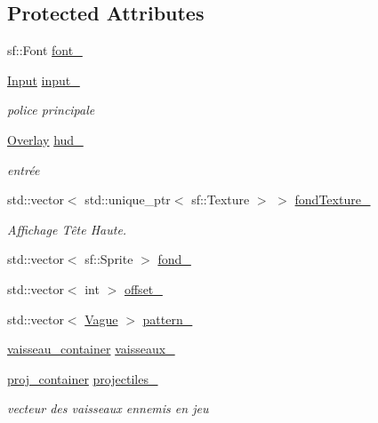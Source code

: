 \subsection*{Protected Attributes}
\begin{DoxyCompactItemize}
\item 
sf\+::\+Font \mbox{\hyperlink{class_partie_ab00aee0dc5c4a9eb16d17160bd6a707a}{font\+\_\+}}
\item 
\mbox{\hyperlink{_input_8h_a5588d60d674991c719a8df848313e966}{Input}} \mbox{\hyperlink{class_partie_a3a6f85686da661a2391dec412354c846}{input\+\_\+}}
\begin{DoxyCompactList}\small\item\em police principale \end{DoxyCompactList}\item 
\mbox{\hyperlink{class_overlay}{Overlay}} \mbox{\hyperlink{class_partie_a7d7dcc006ac52993ac65de1eae66bbf8}{hud\+\_\+}}
\begin{DoxyCompactList}\small\item\em entrée \end{DoxyCompactList}\item 
std\+::vector$<$ std\+::unique\+\_\+ptr$<$ sf\+::\+Texture $>$ $>$ \mbox{\hyperlink{class_partie_a6b8aaa7f87cb0322d88664b8537199fe}{fond\+Texture\+\_\+}}
\begin{DoxyCompactList}\small\item\em Affichage Tête Haute. \end{DoxyCompactList}\item 
std\+::vector$<$ sf\+::\+Sprite $>$ \mbox{\hyperlink{class_partie_aa38a80047a4aeef608547aa009efa9df}{fond\+\_\+}}
\item 
std\+::vector$<$ int $>$ \mbox{\hyperlink{class_partie_af4b24b3fbc38c42ce0b5195f6ed4311c}{offset\+\_\+}}
\item 
std\+::vector$<$ \mbox{\hyperlink{class_vague}{Vague}} $>$ \mbox{\hyperlink{class_partie_ab03632c60e33c4811178d9ce9c9454a9}{pattern\+\_\+}}
\item 
\mbox{\hyperlink{def__type_8h_ad123ed7c93f42c8dd68e4af28b16b639}{vaisseau\+\_\+container}} \mbox{\hyperlink{class_partie_a1f6c75c92798030521ce18b970a0de2f}{vaisseaux\+\_\+}}
\item 
\mbox{\hyperlink{def__type_8h_a87980cd8ee9533e561a73e8bbc728188}{proj\+\_\+container}} \mbox{\hyperlink{class_partie_afcd3073034167783fff10711df2dc036}{projectiles\+\_\+}}
\begin{DoxyCompactList}\small\item\em vecteur des vaisseaux ennemis en jeu \end{DoxyCompactList}\item 

\end{DoxyCompactItemize}
